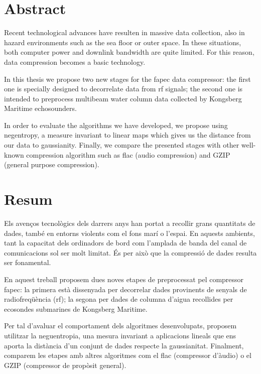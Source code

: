 \chapter*{Abstract}
Recent technological advances have resulten in massive data collection, also in hazard environments such as the sea floor or outer space. In these situations, both computer power and downlink bandwidth are quite limited. For this reason, data compression becomes a basic technology.

In this thesis we propose two new stages for the \acrshort{fapec} data compressor: the first one is specially designed to decorrelate data from \acrfull{rf} signals; the second one is intended to preprocess multibeam water column data collected by Kongsberg Maritime echosounders.

In order to evaluate the algorithms we have developed, we propose using negentropy, a measure invariant to linear maps which gives us the distance from our data to gaussianity. Finally, we compare the presented stages with other well-known compression algorithm such as \acrshort{flac} (audio compression) and GZIP (general purpose compression).

\chapter*{Resum}
Els avenços tecnològics dels darrers anys han portat a recollir grans quantitats de dades, també en entorns violents com el fons marí o l’espai. En aquests ambients, tant la capacitat dels ordinadors de bord com l’amplada de banda del canal de comunicacions sol ser molt limitat. És per això que la compressió de dades resulta ser fonamental.

En aquest treball proposem dues noves etapes de preprocessat pel compressor \acrshort{fapec}: la primera està dissenyada per decorrelar dades provinents de senyals de radiofreqüència (\acrshort{rf}); la segona per dades de columna d’aigua recollides per ecosondes submarines de Kongsberg Maritime.

Per tal d’avaluar el comportament dels algoritmes desenvolupats, proposem utilitzar la neguentropia, una mesura invariant a aplicacions lineals que ens aporta la distància d’un conjunt de dades respecte la gaussianitat. Finalment, comparem les etapes amb altres algoritmes com el \acrshort{flac} (compressor d’àudio) o el GZIP (compressor de propòsit general).